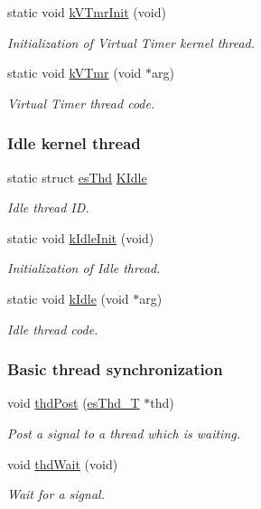 \begin{DoxyCompactItemize}
static void \hyperlink{group__kern__impl_gaa03a91aeb99719724bc64c292f1a5959}{k\-V\-Tmr\-Init} (void)
\begin{DoxyCompactList}\small\item\em Initialization of Virtual Timer kernel thread. \end{DoxyCompactList}\item 
static void \hyperlink{group__kern__impl_gadef1fcf2218955344b2e1d5027f80bee}{k\-V\-Tmr} (void $\ast$arg)
\begin{DoxyCompactList}\small\item\em Virtual Timer thread code. \end{DoxyCompactList}\end{DoxyCompactItemize}
\subsubsection*{Idle kernel thread}
\begin{DoxyCompactItemize}
\item 
static struct \hyperlink{structesThd}{es\-Thd} \hyperlink{group__kern__impl_ga639ded61b40c01f4a1f54814c4b94513}{K\-Idle}
\begin{DoxyCompactList}\small\item\em Idle thread I\-D. \end{DoxyCompactList}\item 
static void \hyperlink{group__kern__impl_ga39cf986cee12aa37a066532e80a5f72a}{k\-Idle\-Init} (void)
\begin{DoxyCompactList}\small\item\em Initialization of Idle thread. \end{DoxyCompactList}\item 
static void \hyperlink{group__kern__impl_ga4e968162935156b6617ff0d5cbccbe1c}{k\-Idle} (void $\ast$arg)
\begin{DoxyCompactList}\small\item\em Idle thread code. \end{DoxyCompactList}\end{DoxyCompactItemize}
\subsubsection*{Basic thread synchronization}
\begin{DoxyCompactItemize}
\item 
void \hyperlink{group__kern__impl_gaae0a028e9f472994def9358f16cc40d3}{thd\-Post} (\hyperlink{group__kern__thd_ga62e3a3ca0a4597a19c43cb8868810d82}{es\-Thd\-\_\-\-T} $\ast$thd)
\begin{DoxyCompactList}\small\item\em Post a signal to a thread which is waiting. \end{DoxyCompactList}\item 
void \hyperlink{group__kern__impl_ga59935809f83133fb909c513fb72576b7}{thd\-Wait} (void)
\begin{DoxyCompactList}\small\item\em Wait for a signal. \end{DoxyCompactList}\end{DoxyCompactItemize}


